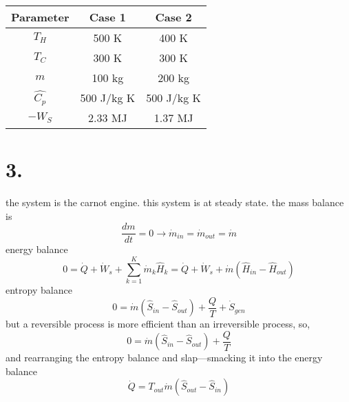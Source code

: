 \documentclass{article}
\begin{document}
\begin{table}[H]
\centering
\begin{tabular}{ccc}
    \toprule
    Parameter & Case 1 & Case 2 \\
    \midrule
    $T_H$ & 500 K & 400 K \\
    $T_C$ & 300 K & 300 K \\
    $m$ & 100 kg & 200 kg \\
    $\hat{C_p}$ & 500 J/kg K & 500 J/kg K \\
    $-W_S$ & 2.33 MJ & 1.37 MJ \\
    \bottomrule
\end{tabular}
\end{table}




\section*{3.}
\begin{center}
\end{center}
the system is the carnot engine. this system is at steady state. the mass balance is
\[ \frac{dm}{dt} = 0 \rightarrow \dot{m}_{in}  = \dot{m}_{out} = \dot{m} \]
energy balance
\[ 0 = \dot{Q} + \dot{W}_s + \sum_{k=1}^{K}\dot{m}_k \hat{H}_k = \dot{Q} + \dot{W}_s + \dot{m}\left(\hat{H}_{in} - \hat{H}_{out}\right) \]
entropy balance
\[ 0 = \dot{m}\left(\hat{S}_{in} - \hat{S}_{out}\right) + \frac{Q}{T} + \dot{S}_{gen} \]
but a reversible process is more efficient than an irreversible process, so, 
\[ 0 = \dot{m}\left(\hat{S}_{in} - \hat{S}_{out}\right) + \frac{Q}{T}  \]
and rearranging the entropy balance and slap---smacking it into the energy balance
\[ \dot{Q} = T_{out} \dot{m} \left( \hat{S}_{out} - \hat{S}_{in} \right) \]
\end{document}
